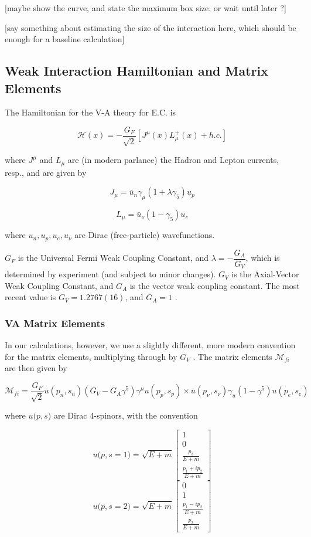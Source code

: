 \documentclass[%
 aip,
 jmp,%
 amsmath,amssymb,
 reprint,%
]{revtex4-1}
\begin{document}
[maybe show the curve, and state the maximum box size. or wait until later ?]  

[say something about estimating the size of the interaction here, which should be enough for a baseline calculation]


\subsection{Weak Interaction Hamiltonian and Matrix Elements}

The Hamiltonian for the V-A theory for E.C. is \cite{ec-review1,ec-review2} 

$$\mathcal{H}(x)=-\dfrac{G_{F}}{\sqrt{2}}\left[J^{\mu}(x)L^{+}_{\mu}(x)+h.c.\right]$$

where $J^{\mu}$ and $L_{\mu}$ are (in modern parlance) the Hadron and Lepton currents, resp., and are given by

$$J_{\mu}=\bar{u}_{n}\gamma_{\mu}(1+\lambda\gamma_{5})u_{p}$$

$$L_{\mu}=\bar{u}_{\nu}(1-\gamma_{5})u_{e}$$

where $u_{n},u_{p},u_{e},u_{\nu}$ are Dirac (free-particle) wavefunctions.   

$G_{F}$ is the Universal Fermi Weak Coupling Constant, and $\lambda=-\dfrac{G_{A}}{G_{V}}$, which is determined by experiment (and subject to minor changes). 
 $G_{V}$ is the Axial-Vector Weak Coupling Constant, and $G_{A}$ is the vector weak coupling
constant.  The most recent value is $G_{V}=1.2767(16)$, and $G_{A}=1$ \cite{vacoupling}.


\subsubsection{VA Matrix Elements}

In our calculations, however, we use a slightly different, more modern convention for the matrix elements, multiplying through by $G_{V}$ \cite{zuber}.   The matrix elements $\mathcal{M}_{fi}$ are then given by

$$\mathcal{M}_{fi}=\dfrac{G_{F}}{\sqrt{2}}\bar{u}(p_{n},s_{n})(G_{V}-G_{A}\gamma^{5})\gamma^{\mu}u(p_{p},s_{p})\times\bar{u}(p_{\nu},s_{\nu})\gamma_{u}(1-\gamma^{5})u(p_{e},s_{e})$$

where $u{(p},s)$ are Dirac 4-spinors, with the convention

$$u{(p},s=1)=\sqrt{E+m}\left[\begin{array}{c}
1\\
0\\
\frac{p_{3}}{E+m}\\
\frac{p_{1}+ip_{2}}{E+m}
\end{array}\right]$$
$$u{(p},s=2)=\sqrt{E+m}\left[\begin{array}{c}
0\\
1\\
\frac{p_{1}-ip_{2}}{E+m}\\
\frac{p_{3}}{E+m}
\end{array}\right]$$
\end{document}
